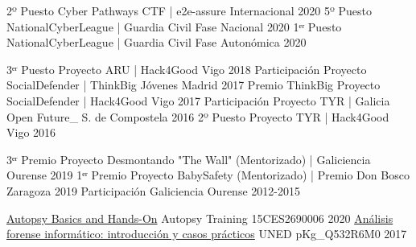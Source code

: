 \documentclass[11pt, a4paper]{style}
\begin{document}
\cvsubsection{\\\\Hacking}
\begin{cvhonors}
  \cvhonor
    {2º Puesto} %
    {Cyber Pathways CTF | e2e-assure} %
    {Internacional} %
    {2020} %
  \cvhonor
    {5º Puesto} %
    {NationalCyberLeague | Guardia Civil} %
    {Fase Nacional} %
    {2020} %
  \cvhonor
    {1ᵉʳ Puesto} %
    {NationalCyberLeague | Guardia Civil} %
    {Fase Autonómica} %
    {2020} %
\end{cvhonors}
\begin{cvhonors}
  \cvhonor
    {3ᵉʳ Puesto} %
    {Proyecto ARU | Hack4Good} %
    {Vigo} %
    {2018} %
  \cvhonor
    {Participación} %
    {Proyecto SocialDefender | ThinkBig Jóvenes} %
    {Madrid} %
    {2017} %
  \cvhonor
    {Premio ThinkBig} %
    {Proyecto SocialDefender | Hack4Good} %
    {Vigo} %
    {2017} %
  \cvhonor
    {Participación} %
    {Proyecto TYR | Galicia Open Future\_} %
    {S. de Compostela} %
    {2016} %
  \cvhonor
    {2º Puesto} %
    {Proyecto TYR | Hack4Good} %
    {Vigo} %
    {2016} %
\end{cvhonors}
\begin{cvhonors}
  \cvhonor
    {3ᵉʳ Premio} %
    {Proyecto Desmontando "The Wall" (Mentorizado) | Galiciencia} %
    {Ourense} %
    {2019} %
  \cvhonor
    {1ᵉʳ Premio} %
    {Proyecto BabySafety (Mentorizado) | Premio Don Bosco} %
    {Zaragoza} %
    {2019} %
  \cvhonor
    {Participación} %
    {Galiciencia} %
    {Ourense} %
    {2012-2015} %
\end{cvhonors}
\begin{cvhonors}
  \cvhonor
    {\href{https://training.autopsy.com/certificates/whyhnafde1}{Autopsy Basics and Hands-On}} %
    {Autopsy Training} %
    {15CES2690006} %
    {2020} %
  \cvhonor
    {\href{https://extension.uned.es/ajax/ops.php?espacio=exportacion&clase=Doc&funcion=certificado&var1=pKg+Q532R6M0&json=0&op=accion}{Análisis forense informático: introducción y casos prácticos}} %
    {UNED} %
    {pKg\_Q532R6M0} %
    {2017} %
\end{cvhonors}
\end{document}
